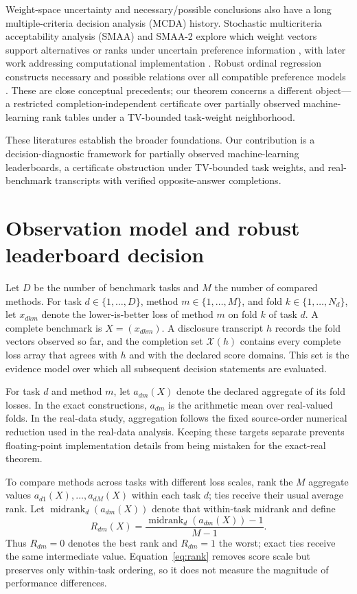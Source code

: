 \documentclass[preprint,11pt]{elsarticle}
\begin{document}
Weight-space uncertainty and necessary/possible conclusions also have a long multiple-criteria decision analysis (MCDA) history. Stochastic multicriteria acceptability analysis (SMAA) and SMAA-2 explore which weight vectors support alternatives or ranks under uncertain preference information \cite{r19,r20}, with later work addressing computational implementation \cite{r21}. Robust ordinal regression constructs necessary and possible relations over all compatible preference models \cite{r22,r23,r24}. These are close conceptual precedents; our theorem concerns a different object---a restricted completion-independent certificate over partially observed machine-learning rank tables under a TV-bounded task-weight neighborhood.

These literatures establish the broader foundations. Our contribution is a decision-diagnostic framework for partially observed machine-learning leaderboards, a certificate obstruction under TV-bounded task weights, and real-benchmark transcripts with verified opposite-answer completions.

\section{Observation model and robust leaderboard decision}

Let $D$ be the number of benchmark tasks and $M$ the number of compared methods. For task $d\in\{1,\ldots,D\}$, method $m\in\{1,\ldots,M\}$, and fold $k\in\{1,\ldots,N_d\}$, let $x_{dkm}$ denote the lower-is-better loss of method $m$ on fold $k$ of task $d$. A complete benchmark is $X=(x_{dkm})$. A disclosure transcript $h$ records the fold vectors observed so far, and the completion set $\mathcal X(h)$ contains every complete loss array that agrees with $h$ and with the declared score domains. This set is the evidence model over which all subsequent decision statements are evaluated.

For task $d$ and method $m$, let $a_{dm}(X)$ denote the declared aggregate of its fold losses. In the exact constructions, $a_{dm}$ is the arithmetic mean over real-valued folds. In the real-data study, aggregation follows the fixed source-order numerical reduction used in the real-data analysis. Keeping these targets separate prevents floating-point implementation details from being mistaken for the exact-real theorem.

To compare methods across tasks with different loss scales, rank the $M$ aggregate values $a_{d1}(X),\ldots,a_{dM}(X)$ within each task $d$; ties receive their usual average rank. Let $\operatorname{midrank}_d(a_{dm}(X))$ denote that within-task midrank and define
\begin{equation}\label{eq:rank}
R_{dm}(X)=\frac{\operatorname{midrank}_d(a_{dm}(X))-1}{M-1}.
\end{equation}
Thus $R_{dm}=0$ denotes the best rank and $R_{dm}=1$ the worst; exact ties receive the same intermediate value. Equation~\eqref{eq:rank} removes score scale but preserves only within-task ordering, so it does not measure the magnitude of performance differences.
\end{document}
